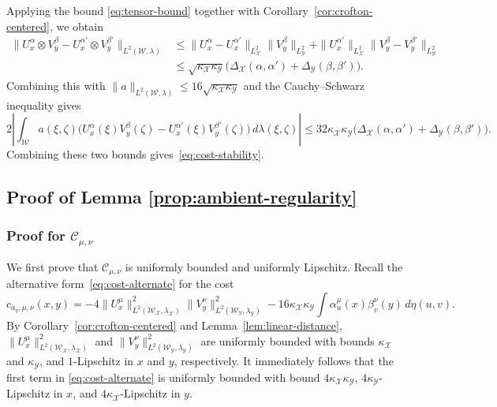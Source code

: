 \documentclass[11pt]{amsart}
\theoremstyle{definition}
\theoremstyle{remark}
\newcommand{\1}{\mathbf{1}}
\numberwithin{equation}{section}
\begin{document}
Applying the bound \eqref{eq:tensor-bound} together with
Corollary~\ref{cor:crofton-centered}, we obtain
\begin{align*}
\|U_x^\alpha\otimes V_y^\beta-U_x^{\alpha'}\otimes V_y^{\beta'}\|_{L^2(\mathcal W,\lambda)}
&\le
\|U_x^\alpha-U_x^{\alpha'}\|_{L^2_\mathcal X}
\|V_y^\beta\|_{L^2_\mathcal Y}
+
\|U_x^{\alpha'}\|_{L^2_\mathcal X}
\|V_y^\beta-V_y^{\beta'}\|_{L^2_\mathcal Y}\\
&\le
\sqrt{\kappa_{\mathcal X}\kappa_{\mathcal Y}}
\bigl(\Delta_{\mathcal X}(\alpha,\alpha')
+\Delta_{\mathcal Y}(\beta,\beta')\bigr).
\end{align*}
Combining this with
$\|a\|_{L^2(\mathcal W,\lambda)}\le 16\sqrt{\kappa_{\mathcal X}\kappa_{\mathcal Y}}$
and the Cauchy--Schwarz inequality gives
\[
2\left|\int_{\mathcal W}a(\xi,\zeta)
\bigl(U_x^\alpha(\xi)V_y^\beta(\zeta)-U_x^{\alpha'}(\xi)V_y^{\beta'}(\zeta)\bigr)
\,d\lambda(\xi,\zeta)\right|
\le
32\kappa_{\mathcal X}\kappa_{\mathcal Y}
\bigl(\Delta_{\mathcal X}(\alpha,\alpha')+\Delta_{\mathcal Y}(\beta,\beta')\bigr).
\]
Combining these two bounds gives~\eqref{eq:cost-stability}.

\subsection{Proof of Lemma \ref{prop:ambient-regularity}}
\label{pf:ambient-regularity}

\subsubsection*{Proof for $\mathcal C_{\mu,\nu}$}
We first prove that $\mathcal C_{\mu,\nu}$ is uniformly bounded and
uniformly Lipschitz. Recall the alternative form~\eqref{eq:cost-alternate}
for the cost
\[
  c_{a_\eta, \mu, \nu}(x,y)= -4\|U_x^\mu\|^2_{L^2(\mathcal{W}_\mathcal{X}, \lambda_\mathcal{X})}\|V_y^\nu\|^2_{L^2(\mathcal{W}_\mathcal{Y}, \lambda_\mathcal{Y})}
  - 16\kappa_\mathcal{X}\kappa_\mathcal{Y} \int \alpha_u^\mu(x)\beta_v^\nu(y) \, d\eta(u,v).
\]
By Corollary~\ref{cor:crofton-centered} and
Lemma~\ref{lem:linear-distance},
$\|U_x^\mu\|^2_{L^2(\mathcal{W}_\mathcal{X}, \lambda_\mathcal{X})}$ and
$\|V_y^\nu\|^2_{L^2(\mathcal{W}_\mathcal{Y}, \lambda_\mathcal{Y})}$ are
uniformly bounded with bounds $\kappa_{\mathcal X}$ and
$\kappa_{\mathcal Y}$, and $1$-Lipschitz in $x$ and $y$, respectively. It
immediately follows that the first term in \eqref{eq:cost-alternate} is
uniformly bounded with bound $4\kappa_\mathcal{X}\kappa_\mathcal{Y}$,
$4\kappa_\mathcal{Y}$-Lipschitz in $x$, and
$4\kappa_\mathcal{X}$-Lipschitz in $y$.
\end{document}
